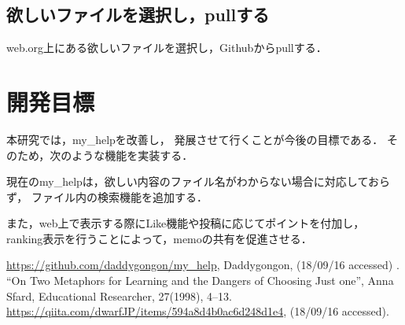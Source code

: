 \documentclass[a4j,twocolumn,uplatex]{jsarticle}
\begin{document}
\subsection{欲しいファイルを選択し，pullする}
\label{sec-2-4}
web.org上にある欲しいファイルを選択し，Githubからpullする．

\begin{comment}
\begin{verbatim}
> my_Help list emacs -c
- emacsのキーバインド
- 
特殊キー操作
-   C-f, controlキーを押しながら    'f'
-   M-f, escキーを押した後一度離して'f'
-     操作の中断C-g, 操作の取り消し(Undo) C-x u
-----
cursor
- C-f, move Forwrard,    前or右へ
- C-b, move Backwrard,   後or左へ
．．．
\end{verbatim}


my\_helpはshell上のdirectory位置によらずどこからでも
呼び出せて，applicationを切り替えることなく参照できる．
また，編集が手軽にできることから
自分独自のメモを取ることによって，
記憶の定着を促すツールとしての活用を意図している．
\end{comment}


\section{開発目標}
本研究では，my\_helpを改善し，
発展させて行くことが今後の目標である．
そのため，次のような機能を実装する．

現在のmy\_helpは，欲しい内容のファイル名がわからない場合に対応しておらず，
ファイル内の検索機能を追加する．

また，web上で表示する際にLike機能や投稿に応じてポイントを付加し，
ranking表示を行うことによって，memoの共有を促進させる．



{\small\setlength\baselineskip{9pt}	%
\begin{thebibliography}{9}
\url{https://github.com/daddygongon/my_help}, Daddygongon, (18/09/16 accessed) .
“On Two Metaphors for Learning and the Dangers of Choosing Just one”, Anna
Sfard, Educational Researcher, 27(1998), 4–13.
 \url{https://qiita.com/dwarfJP/items/594a8d4b0ac6d248d1e4}, (18/09/16 accessed).
\end{thebibliography}
}
\end{document}

